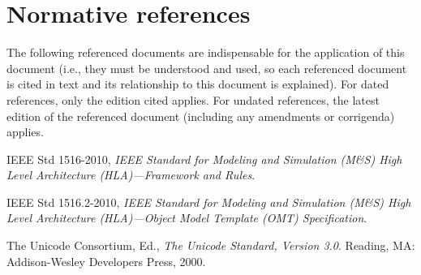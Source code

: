 \clearpage


\section{Normative references}

The following referenced documents are indispensable for the application of this document (i.e., they must be understood and used, so each referenced document is cited in text and its relationship to this document is explained). For dated references, only the edition cited applies. For undated references, the latest edition of the referenced document (including any amendments or corrigenda) applies.

IEEE Std 1516-2010, \textit{IEEE Standard for Modeling and Simulation (M\&S) High Level Architecture (HLA)---Framework and Rules}.

IEEE Std 1516.2-2010, \textit{IEEE Standard for Modeling and Simulation (M\&S) High Level Architecture (HLA)---Object Model Template (OMT) Specification}.

The Unicode Consortium, Ed., \textit{The Unicode Standard, Version 3.0}. Reading, MA: Addison-Wesley Developers Press, 2000.

\clearpage
\thispagestyle{body}
\null
\clearpage
